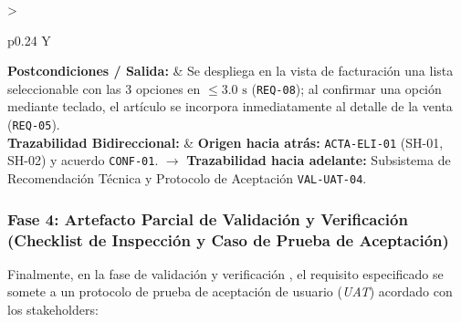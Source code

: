 \documentclass[conference,10pt]{IEEEtran}
\begin{document}
\begin{table}[htbp]
\begin{tabularx}{\textwidth}{>{\raggedright\arraybackslash}p{} Y}
			\textbf{Postcondiciones / Salida:} & Se despliega en la vista de facturación una lista seleccionable con las 3 opciones en $\le 3.0\text{ s}$ (\texttt{REQ-08}); al confirmar una opción mediante teclado, el artículo se incorpora inmediatamente al detalle de la venta (\texttt{REQ-05}). \\
			\textbf{Trazabilidad Bidireccional:} & \textbf{Origen hacia atrás:} \texttt{ACTA-ELI-01} (SH-01, SH-02) y acuerdo \texttt{CONF-01}. $\rightarrow$ \textbf{Trazabilidad hacia adelante:} Subsistema de Recomendación Técnica y Protocolo de Aceptación \texttt{VAL-UAT-04}. \\
			\bottomrule
		\end{tabularx}
	\end{table}
	\subsubsection{Fase 4: Artefacto Parcial de Validación y Verificación (Checklist de Inspección y Caso de Prueba de Aceptación)}
	Finalmente, en la fase de validación y verificación \cite{ieee29148, pohl2025}, el requisito especificado se somete a un protocolo de prueba de aceptación de usuario (\textit{UAT}) acordado con los stakeholders:
\end{document}
